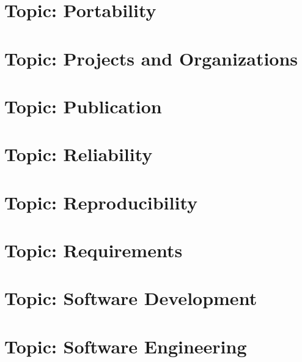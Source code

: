 \documentclass[twoside]{book}
\newcommand{\+}{\discretionary{\mbox{\scriptsize$\hookleftarrow$}}{}{}}
\begin{document}
\chapter{Topic\+: Portability}
\label{md_markdown_topic_portability}

\chapter{Topic\+: Projects and Organizations}
\label{md_markdown_topic_projects_and_organizations}

\chapter{Topic\+: Publication}
\label{md_markdown_topic_publication}

\chapter{Topic\+: Reliability}
\label{md_markdown_topic_reliability}

\chapter{Topic\+: Reproducibility}
\label{md_markdown_topic_reproducibility}

\chapter{Topic\+: Requirements}
\label{md_markdown_topic_requirements}

\chapter{Topic\+: Software Development}
\label{md_markdown_topic_software_development}

\chapter{Topic\+: Software Engineering}
\label{md_markdown_topic_software_engineering}

\end{document}
